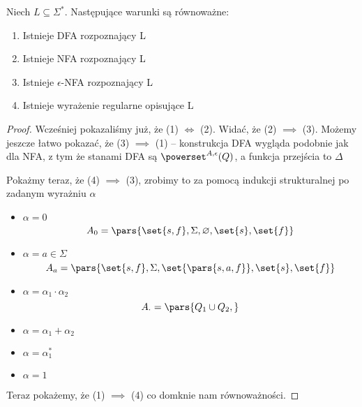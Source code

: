 \begin{theorem}
    Niech \( L \subseteq \Sigma^* \). Następujące warunki są równoważne:
    \begin{enumerate}
        \item Istnieje DFA rozpoznający L
        \item Istnieje NFA rozpoznający L
        \item Istnieje \(\epsilon\)-NFA rozpoznający L
        \item Istnieje wyrażenie regularne opisujące L
    \end{enumerate}
\end{theorem}
\begin{proof}

    Wcześniej pokazaliśmy już, że (1) \( \iff \) (2).
    Widać, że (2) \(\implies \) (3).
    Możemy jeszcze łatwo pokazać, że (3) \( \implies \) (1) -- konstrukcja DFA wygląda podobnie jak dla NFA, z tym że stanami DFA są \( \powerset^{A, \epsilon}(Q) \), a funkcja przejścia to \( \Delta \)
    
    Pokażmy teraz, że (4) \( \implies \) (3), zrobimy to za pomocą indukcji strukturalnej po zadanym wyrażniu \( \alpha \)
    
    \begin{itemize}
        \item \( \alpha = 0 \)
        \[
            A_0 = \pars{\set{s, f}, \Sigma, \varnothing, \set{s}, \set{f}} 
        \]
        
        \item \( \alpha = a \in \Sigma \)
        \[
            A_a = \pars{\set{s, f}, \Sigma, \set{
            \pars{
            s, a, f
            }
            }, \set{s}, \set{f}} 
        \]
        
        \item \( \alpha = \alpha_1 \cdot \alpha_2 \)
        \[
            A_{\cdot} = \pars{Q_1 \cup Q_2, }
        \]
        
        \item \( \alpha = \alpha_1 + \alpha_2 \)
        
        \item \( \alpha = \alpha_1^* \)
        
         \item \( \alpha = 1 \)
    \end{itemize}
    
    
    Teraz pokażemy, że (1) \( \implies \) (4) co domknie nam równoważności.


\end{proof}
